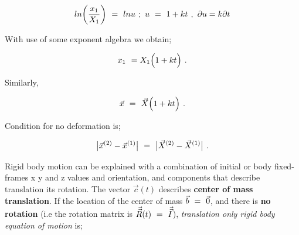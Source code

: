 \documentclass{article}
\newcounter{subsubsubsection}[subsubsection]
\begin{document}
\begin{equation} \label{eq:1}
ln \bigg(\frac{x_1}{X_1}\bigg) \hspace{0.125cm} =  \hspace{0.125cm} ln u   \hspace{0.125cm} ; \hspace{0.125cm} u \hspace{0.125cm} = \hspace{0.125cm} 1 + kt  \hspace{0.125cm} , \hspace{0.125cm} \partial{u} = k \partial{t}
\end{equation}

With use of some exponent algebra we obtain;

\begin{equation} \label{eq:1}
x_1 \hspace{0.125cm} = X_1 \Big( 1 + k t \Big)  \hspace{0.125cm} .
\end{equation}

Similarly,

\begin{equation} \label{eq:1}
\vec{x} \hspace{0.125cm} = \hspace{0.125cm} \vec{X} \Big( 1 + k t \Big)  \hspace{0.125cm} .
\end{equation}


Condition for no deformation is;

\begin{equation} \label{eq:1}
\big| \vec{x}^{(2)} - \vec{x}^{(1)} \big| \hspace{0.125cm} = \hspace{0.125cm} \big| \vec{X}^{(2)} - \vec{X}^{(1)} \big|  \hspace{0.125cm} .
\end{equation}

Rigid body motion can be explained with a combination of initial or body fixed-frames x y and z values and orientation, and components that describe translation its rotation. The vector \begin{math} \vec{c}(t) \end{math} describes \textbf{center of mass translation}. If the location of the center of mass \begin{math} \vec{b} \hspace{0.125cm} = \hspace{0.125cm} \vec{0} \end{math}, and there is \textbf{no rotation} (i.e the rotation matrix is \begin{math} \vec{\vec{R}}(t) \hspace{0.125cm} = \hspace{0.125cm} \vec{\vec{I}} \end{math}), \textit{translation only rigid body equation of motion} is;
\end{document}
